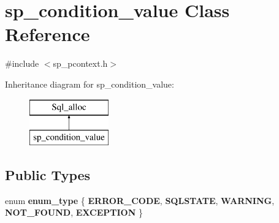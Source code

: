 \hypertarget{classsp__condition__value}{}\section{sp\+\_\+condition\+\_\+value Class Reference}
\label{classsp__condition__value}


{\ttfamily \#include $<$sp\+\_\+pcontext.\+h$>$}

Inheritance diagram for sp\+\_\+condition\+\_\+value\+:\begin{figure}[H]
\begin{center}
\leavevmode
\includegraphics[height=2.000000cm]{classsp__condition__value}
\end{center}
\end{figure}
\subsection*{Public Types}
\begin{DoxyCompactItemize}
\item 
\mbox{\label{classsp__condition__value_ae0cd1ab46cf8fccade87303418b0f01d}} 
enum {\bfseries enum\+\_\+type} \{ \newline
{\bfseries E\+R\+R\+O\+R\+\_\+\+C\+O\+DE}, 
{\bfseries S\+Q\+L\+S\+T\+A\+TE}, 
{\bfseries W\+A\+R\+N\+I\+NG}, 
{\bfseries N\+O\+T\+\_\+\+F\+O\+U\+ND}, 
\newline
{\bfseries E\+X\+C\+E\+P\+T\+I\+ON}
 \}
\end{DoxyCompactItemize}
